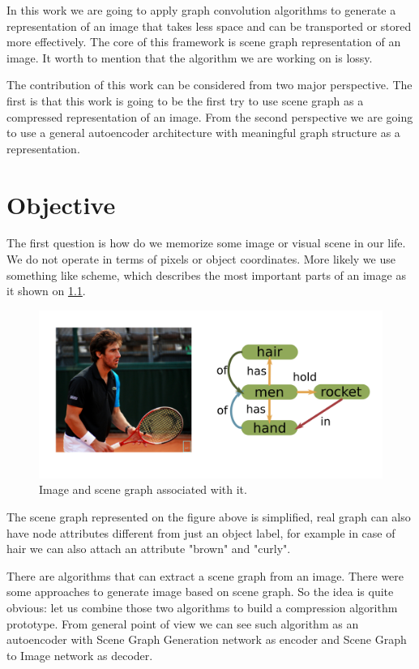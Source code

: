 In this work we are going to apply graph convolution algorithms to generate a representation of an image that takes less space and can be transported or stored more effectively. The core of this framework is scene graph representation of an image. It worth to mention that the algorithm we are working on is lossy.

The contribution of this work can be considered from two major perspective. The first is that this work is going to be the first try to use scene graph as a compressed representation of an image. From the second perspective we are going to use a general autoencoder architecture with meaningful graph structure as a representation.

\chapter{Objective}

The first question is how do we memorize some image or visual scene in our life. We do not operate in terms of pixels or object coordinates. More likely we use something like scheme, which describes the most important parts of an image as it shown on \ref{image_and_scene_graph}.

\begin{figure}[!h]
    \centering
    \includegraphics[width=\textwidth]{figure/image-and-scene-graph.png}
    \caption{Image and scene graph associated with it.}
    \label{image_and_scene_graph}
\end{figure}

The scene graph represented on the figure above is simplified, real graph can also have node attributes different from just an object label, for example in case of hair we can also attach an attribute "brown" and "curly".

There are algorithms that can extract a scene graph from an image. There were some approaches to generate image based on scene graph. So the idea is quite obvious: let us combine those two algorithms to build a compression algorithm prototype. From general point of view we can see such algorithm as an autoencoder with Scene Graph Generation network as encoder and Scene Graph to Image network as decoder.

